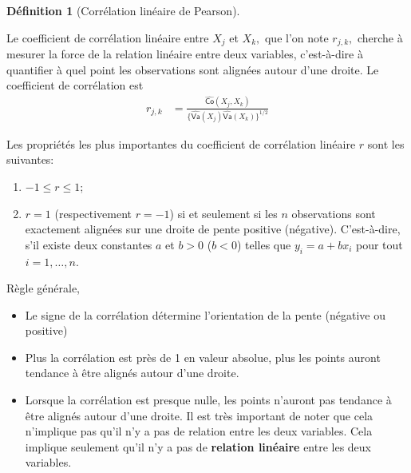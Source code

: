 \documentclass[
  11pt,
  letterpaper,
]{scrbook}
\providecommand{\tightlist}{%
  \setlength{\itemsep}{0pt}\setlength{\parskip}{0pt}}\usepackage{longtable,booktabs,array}
\theoremstyle{plain}
\theoremstyle{plain}
\theoremstyle{definition}
\theoremstyle{definition}
\newtheorem{definition}{Définition}[chapter]
\theoremstyle{remark}
\begin{document}
\begin{definition}[Corrélation linéaire de
Pearson]\protect\hypertarget{def-correlation-Pearson}{}\label{def-correlation-Pearson}

Le coefficient de corrélation linéaire entre \(X_j\) et \(X_k,\) que
l'on note \(r_{j, k},\) cherche à mesurer la force de la relation
linéaire entre deux variables, c'est-à-dire à quantifier à quel point
les observations sont alignées autour d'une droite. Le coefficient de
corrélation est \begin{align*}
r_{j, k} &= \frac{\widehat{\mathsf{Co}}(X_j, X_k)}{\{\widehat{\mathsf{Va}}(X_j) \widehat{\mathsf{Va}}(X_k)\}^{1/2}}
\end{align*}

Les propriétés les plus importantes du coefficient de corrélation
linéaire \(r\) sont les suivantes:

\begin{enumerate}
\def\labelenumi{\arabic{enumi})}
\tightlist
\item
  \(-1 \leq r \leq 1\);
\item
  \(r=1\) (respectivement \(r=-1\)) si et seulement si les \(n\)
  observations sont exactement alignées sur une droite de pente positive
  (négative). C'est-à-dire, s'il existe deux constantes \(a\) et \(b>0\)
  (\(b<0\)) telles que \(y_i=a+b x_i\) pour tout \(i=1, \ldots, n.\)
\end{enumerate}

Règle générale,

\begin{itemize}
\tightlist
\item
  Le signe de la corrélation détermine l'orientation de la pente
  (négative ou positive)
\item
  Plus la corrélation est près de 1 en valeur absolue, plus les points
  auront tendance à être alignés autour d'une droite.
\item
  Lorsque la corrélation est presque nulle, les points n'auront pas
  tendance à être alignés autour d'une droite. Il est très important de
  noter que cela n'implique pas qu'il n'y a pas de relation entre les
  deux variables. Cela implique seulement qu'il n'y a pas de
  \textbf{relation linéaire} entre les deux variables.
\end{itemize}

\end{definition}
\end{document}
